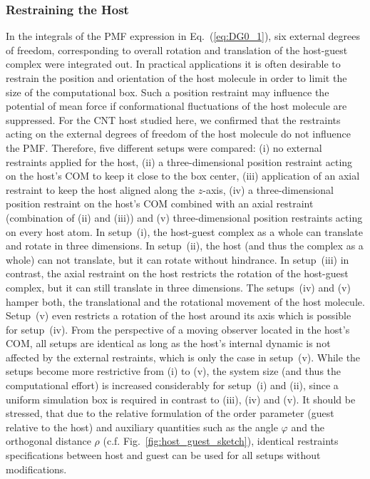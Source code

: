 \documentclass[9pt,lessons,pubversion]{livecoms}
\begin{document}
\subsubsection*{Restraining the Host}
\label{subsec:rest_host}

In the integrals of the PMF expression in Eq.~(\ref{eq:DG0_1}), six external degrees of freedom, corresponding to overall rotation and translation of the host-guest complex were integrated out. 
In practical applications it is often desirable to restrain the position and orientation of the host molecule in order to limit the size of the computational box. 
Such a position restraint may influence the potential of mean force if conformational fluctuations of the host molecule are suppressed. 
For the CNT host studied here, we confirmed that the restraints acting on the external degrees of freedom of the host molecule do not influence the PMF. 
Therefore, five different setups were compared: 
(i) no external restraints applied for the host, 
(ii) a three-dimensional position restraint acting on the host's COM to keep it close to the box center, 
(iii) application of an axial restraint to keep the host aligned along the $z$-axis, 
(iv) a three-dimensional position restraint on the host's COM combined with an axial restraint (combination of (ii) and (iii)) 
and (v) three-dimensional position restraints acting on every host atom.
In setup~(i), the host-guest complex as a whole can translate and rotate in three dimensions. 
In setup~(ii), the host (and thus the complex as a whole) can not translate, but it can rotate without hindrance. 
In setup~(iii) in contrast, the axial restraint on the host restricts the rotation of the host-guest complex, but it can still translate in three dimensions. 
The setups~(iv) and (v) hamper both, the translational and the rotational movement of the host molecule.
Setup~(v) even restricts a rotation of the host around its axis which is possible for setup~(iv).
From the perspective of a moving observer located in the host's COM, all setups are identical as long as the host's internal dynamic is not affected by the external restraints, which is only the case in setup~(v).
While the setups become more restrictive from (i) to (v), the system size (and thus the computational effort) is increased considerably for setup~(i) and (ii), 
since a uniform simulation box is required in contrast to (iii), (iv) and (v).
It should be stressed, that due to the relative formulation of the order parameter (guest relative to the host) and auxiliary quantities such as the angle $\varphi$ and the orthogonal distance $\rho$ 
(c.f. Fig.~\ref{fig:host_guest_sketch}), identical restraints specifications between host and guest can be used for all setups without modifications.
\end{document}
